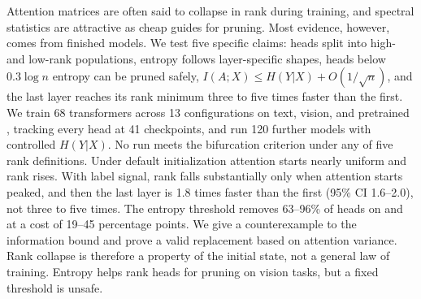 Attention matrices are often said to collapse in rank during training, and spectral statistics are attractive as cheap guides for pruning. Most evidence, however, comes from finished models. We test five specific claims: heads split into high- and low-rank populations, entropy follows layer-specific shapes, heads below $0.3\log n$ entropy can be pruned safely, $I(A;X)\le H(Y|X)+O(1/\sqrt n)$, and the last layer reaches its rank minimum three to five times faster than the first. We train 68 transformers across 13 configurations on text, vision, and pretrained \bert, tracking every head at 41 checkpoints, and run 120 further models with controlled $H(Y|X)$. No run meets the bifurcation criterion under any of five rank definitions. Under default initialization attention starts nearly uniform and rank rises. With label signal, rank falls substantially only when attention starts peaked, and then the last layer is 1.8 times faster than the first (95\% CI 1.6--2.0), not three to five times. The entropy threshold removes 63--96\% of heads on \agnews and \cifar at a cost of 19--45 percentage points. We give a counterexample to the information bound and prove a valid replacement based on attention variance. Rank collapse is therefore a property of the initial state, not a general law of training. Entropy helps rank heads for pruning on vision tasks, but a fixed threshold is unsafe.
